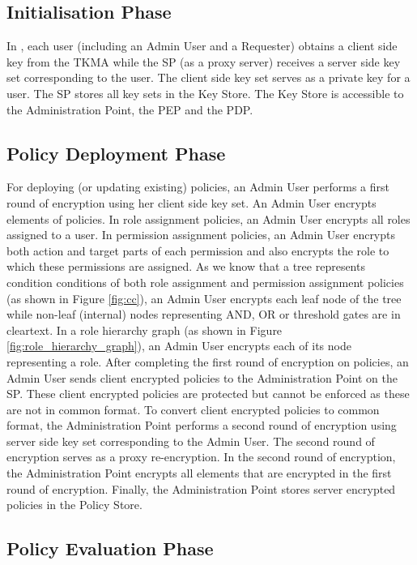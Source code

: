 \documentclass[final,5p,times,twocolumn]{elsarticle}
\begin{document}
\subsection{Initialisation Phase}

In , each user (including an Admin User and a Requester) obtains a client side key from the TKMA while the SP (as a proxy server) receives a server side key set corresponding to the user. The client side key set serves as a private key for a user. The SP stores all key sets in the Key Store. The Key Store is accessible to the Administration Point, the PEP and the PDP.

\subsection{Policy Deployment Phase}

For deploying (or updating existing) policies, an Admin User performs a first round of encryption using her client side key set. An Admin User encrypts elements of policies. In role assignment policies, an Admin User encrypts all roles assigned to a user. In permission assignment policies, an Admin User encrypts both action and target parts of each permission and also encrypts the role to which these permissions are assigned. As we know that a tree represents condition conditions of both role assignment and permission assignment policies (as shown in Figure \ref{fig:cc}), an Admin User encrypts each leaf node of the tree while non-leaf (internal) nodes representing AND, OR or threshold gates are in cleartext. In a role hierarchy graph (as shown in Figure \ref{fig:role_hierarchy_graph}), an Admin User encrypts each of its node representing a role. After completing the first round of encryption on policies, an Admin User sends client encrypted policies to the Administration Point on the SP. These client encrypted policies are protected but cannot be enforced as these are not in common format. To convert client encrypted policies to common format, the Administration Point performs a second round of encryption using server side key set corresponding to the Admin User. The second round of encryption serves as a proxy re-encryption. In the second round of encryption, the Administration Point encrypts all elements that are encrypted in the first round of encryption. Finally, the Administration Point stores server encrypted policies in the Policy Store.

\subsection{Policy Evaluation Phase}
\end{document}
